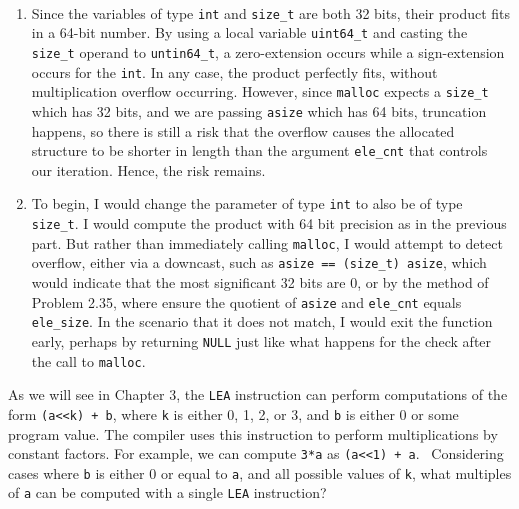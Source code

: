 \documentclass[12pt]{article}
\newenvironment{ex}[2][Exercise]{\begin{trivlist}
		\item[\hskip \labelsep {\bfseries #1}\hskip \labelsep {\bfseries #2.}]}{\end{trivlist}}
\newenvironment{sol}[1][Solution]{\begin{trivlist}
		\item[\hskip \labelsep {\bfseries #1:}]}{\end{trivlist}}
\begin{document}
\begin{sol}
	\
	\begin{enumerate}[label=(\alph*)]
		\item Since the variables of type \texttt{int} and \texttt{size\_t}
		are both 32 bits, their product fits in a 64-bit number. By using a
		local variable \texttt{uint64\_t} and casting the \texttt{size\_t}
		operand to \texttt{untin64\_t}, a zero-extension occurs while a
		sign-extension occurs for the \texttt{int}. In any case, the product
		perfectly fits, without multiplication overflow occurring.
		However, since \texttt{malloc} expects a \texttt{size\_t}
		which has 32 bits, and we are passing \texttt{asize} which has
		64 bits, truncation happens, so there is still a risk that the overflow
		causes the allocated structure to be shorter in length than
		the argument \texttt{ele\_cnt} that controls our iteration.
		Hence, the risk remains.
		\item To begin, I would change the parameter of type \texttt{int}
		to also be of type \texttt{size\_t}. I would compute the product with 64 bit precision as in
		the previous part. But rather than immediately calling \texttt{malloc},
		I would attempt to detect overflow, either via a downcast,
		such as \texttt{asize == (size\_t) asize}, which would indicate
		that the most significant 32 bits are 0, or by the method of
		Problem 2.35, where ensure the quotient of \texttt{asize}
		and \texttt{ele\_cnt} equals \texttt{ele\_size}.
		In the scenario that it does not match, I would exit the function early,
		perhaps by returning \texttt{NULL} just like what happens for the
		check after the call to \texttt{malloc}.
 	\end{enumerate}
\end{sol}

\begin{ex}{2.38}
	As we will see in Chapter 3, the \texttt{LEA} instruction can perform computations of
	the form \texttt{(a<<k) + b}, where \texttt{k} is either 0, 1, 2, or 3, and \texttt{b}
	is either 0 or some program value. The compiler uses this instruction to perform multiplications
	by constant factors. For example, we can compute \texttt{3*a} as \texttt{(a<<1) + a}.
	\
	Considering cases where \texttt{b} is either 0 or equal to \texttt{a}, and all possible values
	of \texttt{k}, what multiples of \texttt{a} can be computed with a single \texttt{LEA}
	instruction?
\end{ex}
\end{document}
